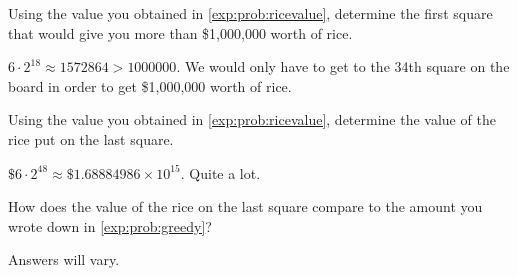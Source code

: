 \begin{problem}
\begin{subproblem}
	Using the value you obtained in \cref{exp:prob:ricevalue}, determine the first square 
	that would give you more than \$1,000,000 worth of rice.
	\begin{shortsolution}
		$6\cdot 2^{18}\approx 1572864>1000000$. We would only have to get to the 34th square on the board in 
		order to get \$1,000,000 worth of rice.
	\end{shortsolution}
\end{subproblem}
\begin{subproblem}
	Using the value you obtained in \cref{exp:prob:ricevalue}, determine the value
	of the rice put on the last square. 
	\begin{shortsolution}
		$\$6\cdot 2^{48}\approx \$ 1.68884986\times 10^{15}$. Quite a lot.
	\end{shortsolution}
\end{subproblem}
\begin{subproblem}
	How does the value of the rice on the last square compare to the amount you wrote down in \cref{exp:prob:greedy}?
	\begin{shortsolution}
		Answers will vary.
	\end{shortsolution}
\end{subproblem}
\end{problem}
